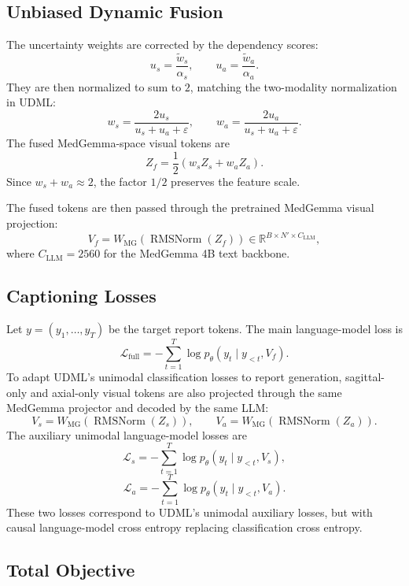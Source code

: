 \subsection{Unbiased Dynamic Fusion}

The uncertainty weights are corrected by the dependency scores:
\[
    u_s = \frac{\tilde{w}_s}{\alpha_s},
    \qquad
    u_a = \frac{\tilde{w}_a}{\alpha_a}.
\]
They are then normalized to sum to \(2\), matching the two-modality normalization in UDML:
\[
    w_s
    =
    \frac{2u_s}{u_s+u_a+\varepsilon},
    \qquad
    w_a
    =
    \frac{2u_a}{u_s+u_a+\varepsilon}.
\]
The fused MedGemma-space visual tokens are
\[
    Z_f
    =
    \frac{1}{2}
    \left(
        w_s Z_s + w_a Z_a
    \right).
\]
Since \(w_s+w_a \approx 2\), the factor \(1/2\) preserves the feature scale.

The fused tokens are then passed through the pretrained MedGemma visual projection:
\[
    V_f
    =
    W_{\text{MG}}
    \left(
        \operatorname{RMSNorm}(Z_f)
    \right)
    \in \mathbb{R}^{B \times N' \times C_{\text{LLM}}},
\]
where \(C_{\text{LLM}}=2560\) for the MedGemma 4B text backbone.

\subsection{Captioning Losses}

Let \(y=(y_1,\ldots,y_T)\) be the target report tokens. The main language-model loss is
\[
    \mathcal{L}_{\text{full}}
    =
    -\sum_{t=1}^{T}
    \log p_{\theta}
    \left(
        y_t
        \mid
        y_{<t}, V_f
    \right).
\]
To adapt UDML's unimodal classification losses to report generation, sagittal-only and axial-only visual tokens are also projected through the same MedGemma projector and decoded by the same LLM:
\[
    V_s
    =
    W_{\text{MG}}
    \left(
        \operatorname{RMSNorm}(Z_s)
    \right),
    \qquad
    V_a
    =
    W_{\text{MG}}
    \left(
        \operatorname{RMSNorm}(Z_a)
    \right).
\]
The auxiliary unimodal language-model losses are
\[
    \mathcal{L}_{s}
    =
    -\sum_{t=1}^{T}
    \log p_{\theta}
    \left(
        y_t
        \mid
        y_{<t}, V_s
    \right),
\]
\[
    \mathcal{L}_{a}
    =
    -\sum_{t=1}^{T}
    \log p_{\theta}
    \left(
        y_t
        \mid
        y_{<t}, V_a
    \right).
\]
These two losses correspond to UDML's unimodal auxiliary losses, but with causal language-model cross entropy replacing classification cross entropy.

\subsection{Total Objective}

